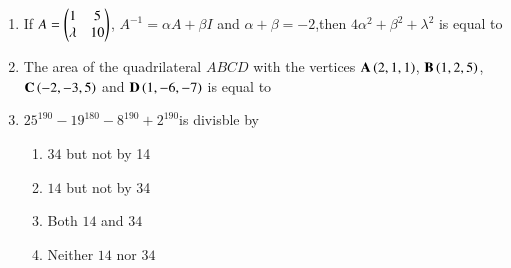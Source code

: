 \documentclass[journal]{IEEEtran}
\numberwithin{equation}{enumi}
\numberwithin{figure}{enumi}
\begin{document}
\begin{enumerate}
	\item If $A=\begin{pmatrix}1 & 5 \\ \lambda & 10\end{pmatrix}$, $A^{-1}=\alpha A+\beta I$ and $\alpha+\beta=-2$,then $4\alpha^2+\beta^2+\lambda^2$ is equal to
        \hfill{}
        \begin{enumerate}    
       \end{enumerate}
       
	\item 
	The area of the quadrilateral $ABCD$ with the vertices $\mathbf{A}\left(2, 1, 1\right)$, $\mathbf{B}\left(1, 2, 5\right)$, $\mathbf{C}\left(-2, -3, 5\right)$ and $\mathbf{D}\left(1, -6, -7\right)$ is equal to 
	\begin{enumerate}    
       \end{enumerate}
       
       
    \item $25^{190}-19^{180}-8^{190}+2^{190}$is divisble by
        \hfill{}
        \begin{multicols}{4}
            \begin{enumerate}
                \item $34$ but not by 14
                \item $14$ but not by 34
                \item Both $14$ and $34$
                \item Neither $14$ nor $34$
            \end{enumerate}
        \end{multicols}
        

\end{enumerate}
\end{document}
